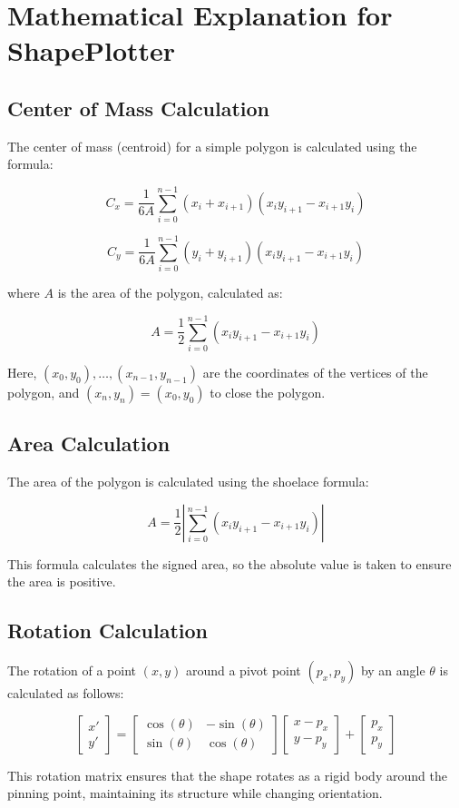 \documentclass{article}
\begin{document}
\section*{Mathematical Explanation for ShapePlotter}

\subsection*{Center of Mass Calculation}

The center of mass (centroid) for a simple polygon is calculated using the formula:

\[
C_x = \frac{1}{6A} \sum_{i=0}^{n-1} (x_i + x_{i+1})(x_i y_{i+1} - x_{i+1} y_i)
\]

\[
C_y = \frac{1}{6A} \sum_{i=0}^{n-1} (y_i + y_{i+1})(x_i y_{i+1} - x_{i+1} y_i)
\]

where $A$ is the area of the polygon, calculated as:

\[
A = \frac{1}{2} \sum_{i=0}^{n-1} (x_i y_{i+1} - x_{i+1} y_i)
\]

Here, $(x_0, y_0), \ldots, (x_{n-1}, y_{n-1})$ are the coordinates of the vertices of the polygon, and $(x_n, y_n) = (x_0, y_0)$ to close the polygon.

\subsection*{Area Calculation}

The area of the polygon is calculated using the shoelace formula:

\[
A = \frac{1}{2} \left| \sum_{i=0}^{n-1} (x_i y_{i+1} - x_{i+1} y_i) \right|
\]

This formula calculates the signed area, so the absolute value is taken to ensure the area is positive.

\subsection*{Rotation Calculation}

The rotation of a point $(x, y)$ around a pivot point $(p_x, p_y)$ by an angle $\theta$ is calculated as follows:

\[
\begin{bmatrix}
x' \\
y'
\end{bmatrix}
=
\begin{bmatrix}
\cos(\theta) & -\sin(\theta) \\
\sin(\theta) & \cos(\theta)
\end{bmatrix}
\begin{bmatrix}
x - p_x \\
y - p_y
\end{bmatrix}
+
\begin{bmatrix}
p_x \\
p_y
\end{bmatrix}
\]

This rotation matrix ensures that the shape rotates as a rigid body around the pinning point, maintaining its structure while changing orientation.
\end{document}
